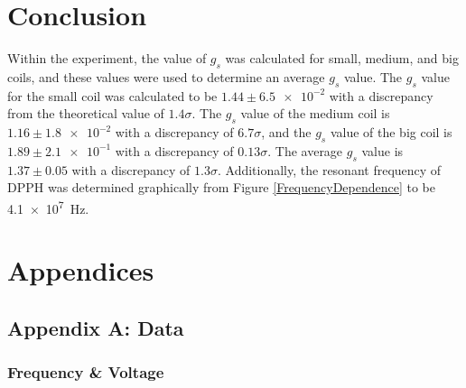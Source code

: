 \documentclass[a4paper]{article}
\begin{document}
\section{Conclusion}
\qq Within the experiment, the value of \( g_s \) was calculated for small,
medium, and big coils, and these values were used to determine an average
\( g_s \) value. The \( g_s \) value for the small coil was calculated to be
\( 1.44 \pm \num{6.5e-2} \) with a discrepancy from the theoretical value of
\( 1.4 \sigma \). The \( g_s \) value of the medium coil is
\( 1.16 \pm \num{1.8e-2} \) with a discrepancy of \( 6.7 \sigma \), and the
\( g_s \) value of the big coil is \( 1.89 \pm \num{2.1e-1} \) with a
discrepancy of \( 0.13 \sigma \). The average \( g_s \) value is
\( 1.37 \pm 0.05 \) with a discrepancy of \( 1.3 \sigma \). Additionally, the
resonant frequency of DPPH was determined graphically from Figure
\ref{FrequencyDependence} to be \SI{4.1e7}{\hertz}.

\section{Appendices}

\subsection{Appendix A: Data}

\subsubsection{Frequency \& Voltage}
\end{document}
